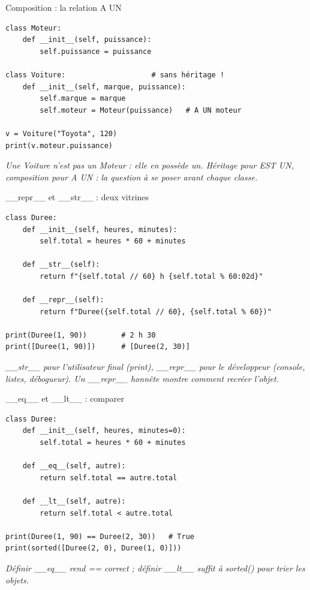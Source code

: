 \documentclass[aspectratio=169,11pt]{beamer}
\begin{document}
\begin{frame}[fragile]{Composition : la relation A UN}

\begin{lstlisting}[style=py]
class Moteur:
    def __init__(self, puissance):
        self.puissance = puissance

class Voiture:                    # sans héritage !
    def __init__(self, marque, puissance):
        self.marque = marque
        self.moteur = Moteur(puissance)   # A UN moteur

v = Voiture("Toyota", 120)
print(v.moteur.puissance)
\end{lstlisting}
\vspace{0.5pt}

{\small\color{PyGris}\itshape Une Voiture n'est pas un Moteur : elle en possède un. Héritage pour EST UN, composition pour A UN : la question à se poser avant chaque classe.}

\end{frame}

\begin{frame}[fragile]{\_\_repr\_\_ et \_\_str\_\_ : deux vitrines}

\begin{lstlisting}[style=py]
class Duree:
    def __init__(self, heures, minutes):
        self.total = heures * 60 + minutes

    def __str__(self):
        return f"{self.total // 60} h {self.total % 60:02d}"

    def __repr__(self):
        return f"Duree({self.total // 60}, {self.total % 60})"

print(Duree(1, 90))        # 2 h 30
print([Duree(1, 90)])      # [Duree(2, 30)]
\end{lstlisting}
\vspace{0.5pt}

{\small\color{PyGris}\itshape \_\_str\_\_ pour l'utilisateur final (print), \_\_repr\_\_ pour le développeur (console, listes, débogueur). Un \_\_repr\_\_ honnête montre comment recréer l'objet.}

\end{frame}

\begin{frame}[fragile]{\_\_eq\_\_ et \_\_lt\_\_ : comparer}

\begin{lstlisting}[style=py]
class Duree:
    def __init__(self, heures, minutes=0):
        self.total = heures * 60 + minutes

    def __eq__(self, autre):
        return self.total == autre.total

    def __lt__(self, autre):
        return self.total < autre.total

print(Duree(1, 90) == Duree(2, 30))   # True
print(sorted([Duree(2, 0), Duree(1, 0)]))
\end{lstlisting}
\vspace{0.5pt}

{\small\color{PyGris}\itshape Définir \_\_eq\_\_ rend == correct ; définir \_\_lt\_\_ suffit à sorted() pour trier les objets.}

\end{frame}
\end{document}
